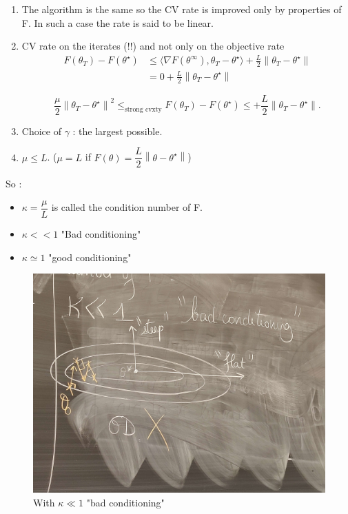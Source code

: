 \begin{note}
    \begin{enumerate}
        \item The algorithm is the same so the CV rate is improved only by properties of F. In such a case the rate is said to be linear.
        \item CV rate on the iterates (!!) and not only on the objective rate 
        \begin{align*}
            F(\theta _T) - F(\theta ^\star ) 
            &\leq \langle \nabla F(\theta ^\infty ), \theta _T - \theta  ^\star \rangle  + \frac{L}{2} \left\| \theta _T  - \theta ^\star \right\| \\
            &= 0 + \frac{L}{2} \left\| \theta _T  - \theta ^\star \right\|
        \end{align*}
        
        \[
            \frac{\mu }{2} \left\| \theta _T - \theta ^\star  \right\| ^2 \leq_{\text{strong cvxty}}  F(\theta _T) - F(\theta ^\star ) \leq  + \frac{L}{2} \left\| \theta _T  - \theta ^\star \right\|
        .\]
        \item Choice of $\gamma$ : the largest possible.
        \item $\mu \leq L$. ($\mu = L$ if $F(\theta)= \dfrac{L}{2}\left\| \theta - \theta ^ {\star} \right\| $)
    \end{enumerate}

    So : \begin{itemize}
        \item $\kappa = \dfrac{\mu}{L}$ is called the condition number of F.
        \item $\kappa << 1$ "Bad conditioning"
        \item $\kappa \simeq 1$ "good conditioning"
    \end{itemize}

    \begin{figure}[!htbp]
        \centering
        \includegraphics[width=.5\textwidth]{figs/bad_kappa.jpg}
        \caption{With $ \kappa \ll 1 $ "bad conditioning" }
    \end{figure}
    

\end{note}
